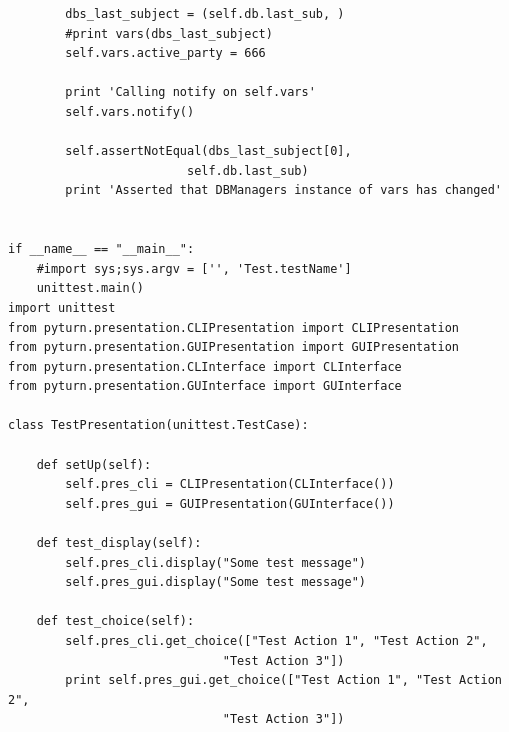 \documentclass[11pt]{report}
\begin{document}
\begin{verbatim}
        dbs_last_subject = (self.db.last_sub, )
        #print vars(dbs_last_subject)
        self.vars.active_party = 666
        
        print 'Calling notify on self.vars'
        self.vars.notify()
        
        self.assertNotEqual(dbs_last_subject[0],
                         self.db.last_sub)
        print 'Asserted that DBManagers instance of vars has changed'
        

if __name__ == "__main__":
    #import sys;sys.argv = ['', 'Test.testName']
    unittest.main()
import unittest
from pyturn.presentation.CLIPresentation import CLIPresentation
from pyturn.presentation.GUIPresentation import GUIPresentation
from pyturn.presentation.CLInterface import CLInterface
from pyturn.presentation.GUInterface import GUInterface

class TestPresentation(unittest.TestCase):
    
    def setUp(self):
        self.pres_cli = CLIPresentation(CLInterface())
        self.pres_gui = GUIPresentation(GUInterface())

    def test_display(self):
        self.pres_cli.display("Some test message")
        self.pres_gui.display("Some test message")
        
    def test_choice(self):
        self.pres_cli.get_choice(["Test Action 1", "Test Action 2", 
                              "Test Action 3"])
        print self.pres_gui.get_choice(["Test Action 1", "Test Action 2", 
                              "Test Action 3"])

\end{verbatim}
\end{document}
